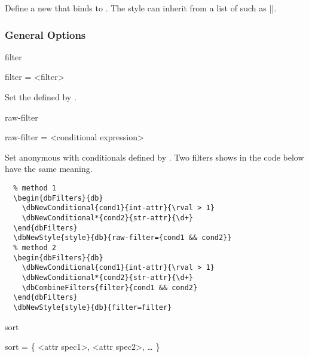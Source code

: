 \documentclass[full]{l3doc}
\begin{document}
\begin{documentation}
\begin{function}[added=2022-01-05]{\dbNewStyle}
  \begin{syntax}
        
  \end{syntax}

  Define a new  that binds to . The style can
  inherit from a list of  such as
  ||.
\end{function}

\subsubsection{General Options}

\begin{option}[added=2022-01-05]{filter}
  \begin{syntax}
    filter = <filter>
  \end{syntax}

  Set the  defined by .
\end{option}

\begin{option}[added=2022-01-06]{raw-filter}
  \begin{syntax}
    raw-filter = <conditional expression>
  \end{syntax}

  Set anonymous with conditionals defined by . Two
  filters shows in the code below have the same meaning.
\end{option}

\begin{verbatim}
  % method 1
  \begin{dbFilters}{db}
    \dbNewConditional{cond1}{int-attr}{\rval > 1}
    \dbNewConditional*{cond2}{str-attr}{\d+}
  \end{dbFilters}
  \dbNewStyle{style}{db}{raw-filter={cond1 && cond2}}
  % method 2
  \begin{dbFilters}{db}
    \dbNewConditional{cond1}{int-attr}{\rval > 1}
    \dbNewConditional*{cond2}{str-attr}{\d+}
    \dbCombineFilters{filter}{cond1 && cond2}
  \end{dbFilters}
  \dbNewStyle{style}{db}{filter=filter}
\end{verbatim}

\begin{option}[added=2022-01-05]{sort}
  \begin{syntax}
    sort = \{ <attr spec1>, <attr spec2>, \ldots{} \}
  \end{syntax}


\end{option}
\end{documentation}
\end{document}
